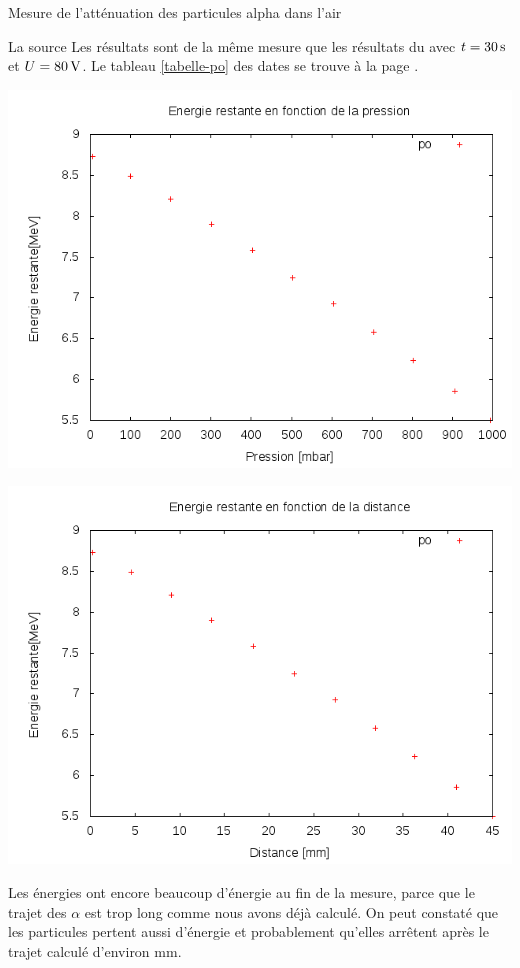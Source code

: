 \documentclass[a4paper,11pt,liststotocnumbered,bibtotocnumbered]{scrartcl}
\begin{document}
\begin{section}{Mesure de l'atténuation des particules alpha dans l'air}
   \begin{subsection}{La source }
    Les résultats sont de la même mesure que les résultats du  avec $t=\unit[30]{s}$ et $U=\unit[80]{V}$. Le tableau \ref{tabelle-po} des dates se trouve à la page \pageref{tabelle-po}.\\
   \begin{minipage}{0.45\textwidth}
     \includegraphics[width=\textwidth]{Sabine/po_pression.png}
    \end{minipage}
    \hfill
    \begin{minipage}{0.45\textwidth}
     \includegraphics[width=\textwidth]{Sabine/po_distance.png}
    \end{minipage}
  Les énergies ont encore beaucoup d'énergie au fin de la mesure, parce que le trajet des $\alpha$ est trop long comme nous avons déjà calculé. On peut constaté que les particules pertent aussi d'énergie et probablement qu'elles arrêtent après le trajet calculé d'environ \unit[81]{mm}. 
  \end{subsection}
   

\end{section}
\end{document}
